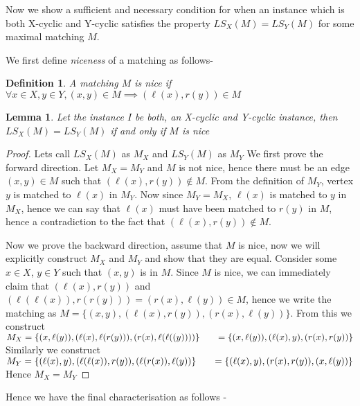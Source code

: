 \documentclass[a4paper,10pt]{article}
\theoremstyle{plain} %
\newtheorem{lemma}[theorem]{Lemma} %
\theoremstyle{plain} %
\newtheorem{definition}{Definition}[section] %
\begin{document}
Now we show a sufficient and necessary condition for when an instance which is both X-cyclic and Y-cyclic satisfies the property $LS_X(M) = LS_Y(M)$ for some maximal matching $M$.

We first define \textit{niceness} of a matching as follows-
\begin{definition}
    A matching $M$ is nice if $\forall x \in X, y \in Y, (x, y) \in M \implies (\ell(x), r(y)) \in M$
\end{definition}

\begin{lemma}
    Let the instance $I$ be both, an X-cyclic and Y-cyclic instance, then $LS_X(M) = LS_Y(M)$ if and only if $M$ is nice
\end{lemma}

\begin{proof}
    Lets call $LS_X(M)$ as $M_X$ and $LS_Y(M)$ as $M_Y$
    We first prove the forward direction. Let $M_X = M_Y$ and $M$ is not nice, hence there must be an edge $(x, y) \in M$ such that $(\ell(x), r(y)) \notin M$. From the definition of $M_Y$, vertex $y$ is matched to $\ell(x)$ in $M_Y$. Now since $M_Y = M_X$, $\ell(x)$ is matched to $y$ in $M_X$, hence we can say that $\ell(x)$ must have been matched to $r(y)$ in $M$, hence a contradiction to the fact that $(\ell(x), r(y)) \notin M$.

    Now we prove the backward direction, assume that $M$ is nice, now we will explicitly construct $M_X$ and $M_Y$ and show that they are equal. Consider some $x \in X$, $y \in Y$ such that $(x, y)$ is in $M$. Since $M$ is nice, we can immediately claim that $(\ell(x), r(y))$ and $(\ell(\ell(x)), r(r(y))) = (r(x), \ell(y)) \in M$, hence we write the matching as $M = \{(x,y), (\ell(x), r(y)), (r(x), \ell(y))\}$. From this we construct 
    \\
    $M_X = \{(x, \ell(y)), (\ell(x), \ell(r(y))), (r(x), \ell(\ell((y))))\} \\ \phantom{M_X } = \{(x, \ell(y)), (\ell(x), y), (r(x), r(y))\}$
    \\
    Similarly we construct
    \\
    $M_Y = \{(\ell(x),y), (\ell(\ell(x)), r(y)), (\ell(r(x)), \ell(y))\} \\ \phantom{M_X } = \{(\ell(x), y), (r(x), r(y)), (x, \ell(y))\}$
    \\
    Hence $M_X = M_Y$
\end{proof}

Hence we have the final characterisation as follows -
\end{document}
